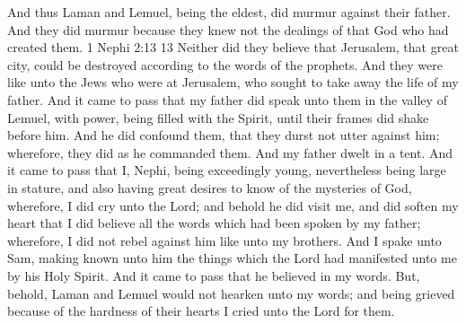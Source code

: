 And thus Laman and Lemuel, being the eldest, did murmur against their father. And they did murmur because they knew not the dealings of that God who had created them.  1 Nephi 2:13 13 Neither did they believe that Jerusalem, that great city, could be destroyed according to the words of the prophets. And they were like unto the Jews who were at Jerusalem, who sought to take away the life of my father.
\bverse \iffalse And it came to pass that my father did speak unto them in the valley of Lemuel, with power, being filled with the Spirit, until their frames did shake before him. And he did confound them, that they durst not utter against him; wherefore, they did as he commanded them. \fi
And it came to pass that my father did speak unto them in the valley of Lemuel, with power, being filled with the Spirit, until their frames did shake before him. And he did confound them, that they durst not utter against him; wherefore, they did as he commanded them.
\bverse \iffalse And my father dwelt in a tent. \fi
And my father dwelt in a tent.
\bverse \iffalse And it came to pass that I, Nephi, being exceedingly young, nevertheless being large in stature, and also having great desires to know of the mysteries of God, wherefore, I did cry unto the Lord; and behold he did visit me, and did soften my heart that I did believe all the words which had been spoken by my father; wherefore, I did not rebel against him like unto my brothers. \fi
And it came to pass that I, Nephi, being exceedingly young, nevertheless being large in stature, and also having great desires to know of the mysteries of God, wherefore, I did cry unto the Lord; and behold he did visit me, and did soften my heart that I did believe all the words which had been spoken by my father; wherefore, I did not rebel against him like unto my brothers.
\bverse \iffalse And I spake unto Sam, making known unto him the things which the Lord had manifested unto me by his Holy Spirit. And it came to pass that he believed in my words. \fi
And I spake unto Sam, making known unto him the things which the Lord had manifested unto me by his Holy Spirit. And it came to pass that he believed in my words.
\bverse \iffalse But, behold, Laman and Lemuel would not hearken unto my words; and being grieved because of the hardness of their hearts I cried unto the Lord for them. \fi
But, behold, Laman and Lemuel would not hearken unto my words; and being grieved because of the hardness of their hearts I cried unto the Lord for them.
\bverse \iffalse And it came to pass that the Lord spake unto me, saying: Blessed art thou, Nephi, because of thy faith, for thou hast sought me diligently, with lowliness of heart. \fi

